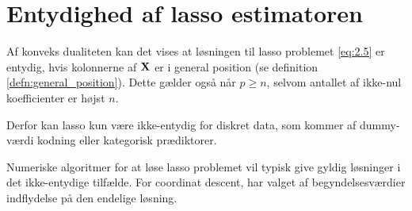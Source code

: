 \section{Entydighed af lasso estimatoren}

Af konveks dualiteten kan det vises at løsningen til lasso problemet \eqref{eq:2.5} er entydig, hvis kolonnerne af \(\mathbf{X}\) er i general position (se definition \ref{defn:general_position}).
Dette gælder også når \(p \geq n\), selvom antallet af ikke-nul koefficienter er højst \(n\).

Derfor kan lasso kun være ikke-entydig for diskret data, som kommer af dummy-værdi kodning eller kategorisk prædiktorer.

Numeriske algoritmer for at løse lasso problemet vil typisk give gyldig løsninger i det ikke-entydige tilfælde.
For coordinat descent, har valget af begyndelsesværdier indflydelse på den endelige løsning.